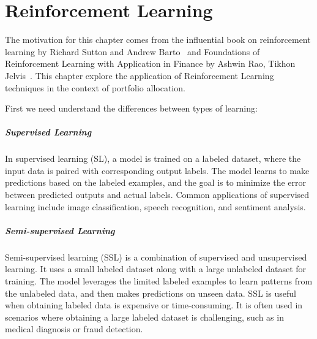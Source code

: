 \documentclass[../xlapes02]{subfiles}
\begin{document}
    \chapter{Reinforcement Learning}\label{ch:reinforcement-learning}

    The motivation for this chapter comes from the influential book on reinforcement learning by Richard Sutton and Andrew Barto~\cite{sutton2018reinforcement} and Foundations of Reinforcement Learning with Application in Finance by Ashwin Rao, Tikhon Jelvis~\cite{rao2022foundations}.
    This chapter explore the application of Reinforcement Learning techniques in the context of portfolio allocation.


    First we need understand the differences between types of learning:

    \paragraph{Supervised Learning}
    In supervised learning (SL), a model is trained on a labeled dataset, where the input data is paired with corresponding output labels.
    The model learns to make predictions based on the labeled examples, and the goal is to minimize the error between predicted outputs and actual labels.
    Common applications of supervised learning include image classification, speech recognition, and sentiment analysis.

    \paragraph{Semi-supervised Learning}
    Semi-supervised learning (SSL) is a combination of supervised and unsupervised learning.
    It uses a small labeled dataset along with a large unlabeled dataset for training.
    The model leverages the limited labeled examples to learn patterns from the unlabeled data, and then makes predictions on unseen data.
    SSL is useful when obtaining labeled data is expensive or time-consuming.
    It is often used in scenarios where obtaining a large labeled dataset is challenging, such as in medical diagnosis or fraud detection.
\end{document}

